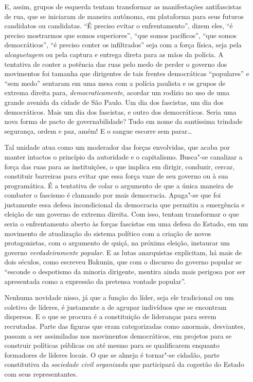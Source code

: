 E, assim, grupos de esquerda tentam transformar as manifestações
antifascistas de rua, que se iniciaram de maneira autônoma, em
plataforma para seus futuros candidatos ou candidatas. ``É preciso
evitar o enfrentamento'', dizem eles, ``é preciso mostrarmos que somos
superiores'', ``que somos pacíficos'', ``que somos democráticos'', ``é
preciso conter os infiltrados'' seja com a força física, seja pela
\emph{alcaguetagem} ou pela captura e entrega direta para as mãos da
polícia. A tentativa de conter a potência das ruas pelo medo de perder o
governo dos movimentos foi tamanha que dirigentes de tais frentes
democráticas ``populares'' e ``sem medo'' sentaram em uma mesa com a
polícia paulista e os grupos de extrema direita para,
\emph{democraticamente}, acordar um rodízio no uso de uma grande avenida
da cidade de São Paulo. Um dia dos fascistas, um dia dos democráticos.
Mais um dia dos fascistas, e outro dos democráticos. Seria uma nova
forma de pacto de governabilidade? Tudo em nome da santíssima trindade
segurança, ordem e paz, amém! E o sangue escorre sem parar\ldots{}

Tal unidade atua como um moderador das forças envolvidas, que acaba por
manter intactos o princípio da autoridade e o capitalismo. Busca"-se
canalizar a força das ruas para as instituições, o que implica em
dirigir, conduzir, cercar, constituir barreiras para evitar que essa
força vaze de seu governo ou à sua programática. É a tentativa de colar
o argumento de que a única maneira de combater o fascismo é clamando por
mais democracia. Apaga"-se que foi justamente essa defesa incondicional
da democracia que permitiu a emergência e eleição de um governo de
extrema direita. Com isso, tentam transformar o que seria o
enfrentamento aberto às forças fascistas em uma defesa do Estado, em um
movimento de atualização do sistema político com a criação de novos
protagonistas, com o argumento de quiçá, na próxima eleição, instaurar
um governo \emph{verdadeiramente popular}. E as lutas anarquistas
explicitam, há mais de dois séculos, como escreveu Bakunin, que com o
discurso do governo popular se ``esconde o despotismo da minoria
dirigente, mentira ainda mais perigosa por ser apresentada como a
expressão da pretensa vontade popular''.

Nenhuma novidade nisso, já que a função do líder, seja ele tradicional
ou um coletivo de líderes, é justamente a de agrupar indivíduos que se
encontram dispersos. E o que se procura é a constituição de lideranças
para serem recrutadas. Parte das figuras que eram categorizadas como
anormais, desviantes, passam a ser assimiladas nos movimentos
democráticos, em projetos para se construir políticas públicas ou até
mesmo para se qualificarem enquanto formadores de líderes locais. O que
se almeja é tornar"-se cidadão, parte constitutiva da \emph{sociedade
civil organizada} que participará da cogestão do Estado com seus
representantes.

